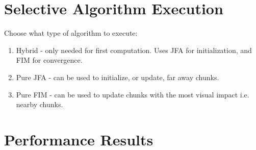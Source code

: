 \begin{table}[h]
    \centering
    \caption{Distance field compute shader execution time using hybrid JFA and FIM approach. Compared against a pure
        FIM execution.}
    \label{tab:hybrid_jfa_fim_perf}
\end{table}

\section{Selective Algorithm Execution}
Choose what type of algorithm to execute:

\begin{enumerate}
    \item Hybrid - only needed for first computation. Uses JFA for initialization, and FIM for convergence.
    \item Pure JFA - can be used to initialize, or update, far away chunks.
    \item Pure FIM - can be used to update chunks with the most visual impact i.e. nearby chunks.
\end{enumerate}

\section{Performance Results}

